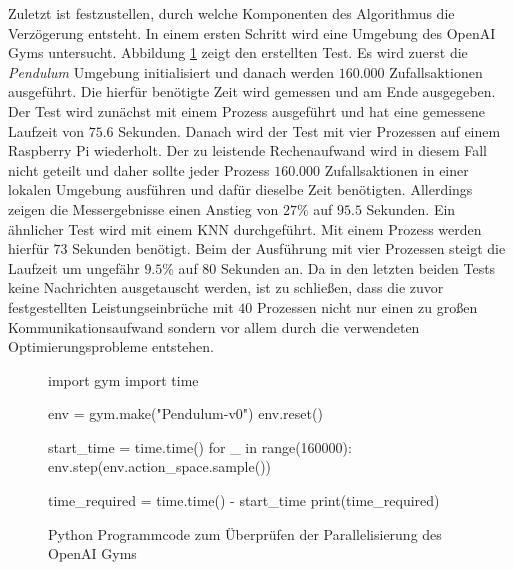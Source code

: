 Zuletzt ist festzustellen, durch welche Komponenten des Algorithmus die Verzögerung entsteht. In einem ersten Schritt wird eine Umgebung des OpenAI Gyms untersucht. Abbildung \ref{fig:test_bottleneck} zeigt den erstellten Test. Es wird zuerst die \emph{Pendulum} Umgebung initialisiert und danach werden $160.000$ Zufallsaktionen ausgeführt. Die hierfür benötigte Zeit wird gemessen und am Ende ausgegeben. Der Test wird zunächst mit einem Prozess ausgeführt und hat eine gemessene Laufzeit von $75.6$ Sekunden. Danach wird der Test mit vier Prozessen auf einem Raspberry Pi wiederholt. Der zu leistende Rechenaufwand wird in diesem Fall nicht geteilt und daher sollte jeder Prozess $160.000$ Zufallsaktionen in einer lokalen Umgebung ausführen und dafür dieselbe Zeit benötigten. Allerdings zeigen die Messergebnisse einen Anstieg von $27\%$ auf $95.5$ Sekunden. Ein ähnlicher Test wird mit einem \ac{KNN} durchgeführt. Mit einem Prozess werden hierfür $73$ Sekunden benötigt. Beim der Ausführung mit vier Prozessen steigt die Laufzeit um ungefähr $9.5\%$ auf 80 Sekunden an. Da in den letzten beiden Tests keine Nachrichten ausgetauscht werden, ist zu schließen, dass die zuvor festgestellten Leistungseinbrüche mit $40$ Prozessen nicht nur einen zu großen Kommunikationsaufwand sondern vor allem durch die verwendeten Optimierungsprobleme entstehen. 
\begin{figure}
	\begin{python}
		import gym
		import time
		
		env = gym.make("Pendulum-v0")
		env.reset()
		
		start_time = time.time()
		for _ in range(160000):
			env.step(env.action_space.sample())
		
		time_required = time.time() - start_time
		print(time_required)
	\end{python}
	\label{fig:test_bottleneck}
	\caption{Python Programmcode zum Überprüfen der Parallelisierung des OpenAI Gyms}
\end{figure} 



